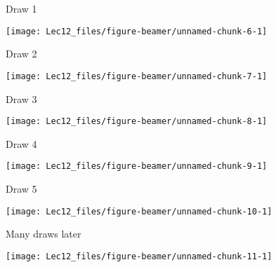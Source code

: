 \documentclass[11pt,ignorenonframetext,]{beamer}
\begin{document}
\begin{frame}{Draw 1}
\protect\hypertarget{draw-1}{}

\begin{center}\texttt{[image: Lec12\_files/figure-beamer/unnamed-chunk-6-1]} \end{center}

\end{frame}

\begin{frame}{Draw 2}
\protect\hypertarget{draw-2}{}

\begin{center}\texttt{[image: Lec12\_files/figure-beamer/unnamed-chunk-7-1]} \end{center}

\end{frame}

\begin{frame}{Draw 3}
\protect\hypertarget{draw-3}{}

\begin{center}\texttt{[image: Lec12\_files/figure-beamer/unnamed-chunk-8-1]} \end{center}

\end{frame}

\begin{frame}{Draw 4}
\protect\hypertarget{draw-4}{}

\begin{center}\texttt{[image: Lec12\_files/figure-beamer/unnamed-chunk-9-1]} \end{center}

\end{frame}

\begin{frame}{Draw 5}
\protect\hypertarget{draw-5}{}

\begin{center}\texttt{[image: Lec12\_files/figure-beamer/unnamed-chunk-10-1]} \end{center}

\end{frame}

\begin{frame}{Many draws later}
\protect\hypertarget{many-draws-later}{}

\begin{center}\texttt{[image: Lec12\_files/figure-beamer/unnamed-chunk-11-1]} \end{center}

\end{frame}
\end{document}
